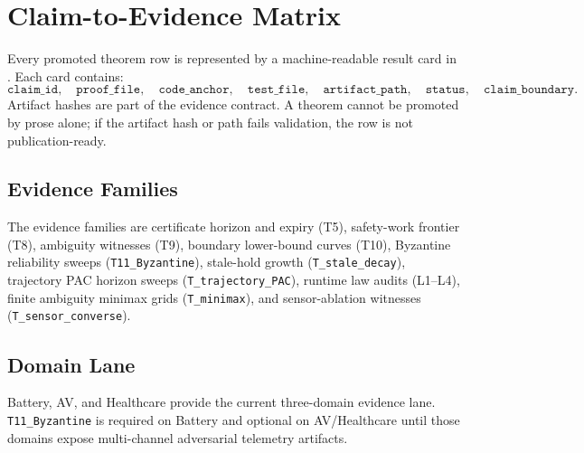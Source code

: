 \chapter{Claim-to-Evidence Matrix}
\label{app:claim-evidence}

Every promoted theorem row is represented by a machine-readable result card in
.  Each card contains:
\[
\texttt{claim\_id},\quad
\texttt{proof\_file},\quad
\texttt{code\_anchor},\quad
\texttt{test\_file},\quad
\texttt{artifact\_path},\quad
\texttt{status},\quad
\texttt{claim\_boundary}.
\]
Artifact hashes are part of the evidence contract.  A theorem cannot be
promoted by prose alone; if the artifact hash or path fails validation, the row
is not publication-ready.

\section{Evidence Families}
The evidence families are certificate horizon and expiry (T5), safety-work
frontier (T8), ambiguity witnesses (T9), boundary lower-bound curves (T10),
Byzantine reliability sweeps (\texttt{T11\_Byzantine}), stale-hold growth
(\texttt{T\_stale\_decay}), trajectory PAC horizon sweeps
(\texttt{T\_trajectory\_PAC}), runtime law audits (L1--L4), finite ambiguity
minimax grids (\texttt{T\_minimax}), and sensor-ablation witnesses
(\texttt{T\_sensor\_converse}).

\section{Domain Lane}
Battery, AV, and Healthcare provide the current three-domain evidence lane.
\texttt{T11\_Byzantine} is required on Battery and optional on AV/Healthcare
until those domains expose multi-channel adversarial telemetry artifacts.
